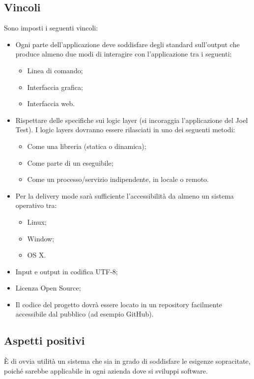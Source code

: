 \subsection{Vincoli}
Sono imposti i seguenti vincoli:
\begin{itemize}
\item Ogni parte dell'applicazione deve soddisfare degli standard sull'output che produce almeno due modi di interagire con l'applicazione tra i seguenti:
\begin{itemize}
\item Linea di comando;
\item Interfaccia grafica;
\item Interfaccia web.
\end{itemize}

\item Rispettare delle specifiche sui logic layer (si incoraggia l'applicazione del Joel Test). I logic layers dovranno essere rilasciati in uno dei seguenti metodi:
\begin{itemize}
\item Come una libreria (statica o dinamica);
\item Come parte di un eseguibile;
\item Come un processo/servizio indipendente, in locale o remoto.
\end{itemize}

\item Per la delivery mode sarà sufficiente l'accessibilità da almeno un sistema operativo tra:
\begin{itemize}
\item Linux;
\item Window;
\item OS X.
\end{itemize}

\item Input e output in codifica UTF-8;
\item Licenza Open Source;
\item Il codice del progetto dovrà essere locato in un repository facilmente accessibile dal pubblico (ad esempio GitHub).
\end{itemize}

\subsection{Aspetti positivi}
\`E di ovvia utilità un sistema che sia in grado di soddisfare le esigenze sopracitate, poiché sarebbe applicabile in ogni azienda dove si sviluppi software.

